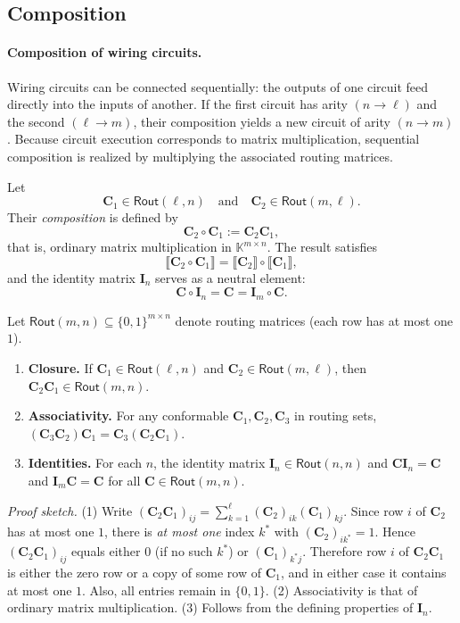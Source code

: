 \documentclass{article}
\newcommand{\K}{\mathbb{K}}                  %
\newcommand{\mat}[1]{\mathbf{#1}}            %
\newcommand{\id}{\mat{I}}                    %
\newcommand{\Rout}[2]{\mathsf{Rout}(#1,#2)}
\begin{document}
\subsection{Composition}

\paragraph{Composition of wiring circuits.}
Wiring circuits can be connected sequentially: the outputs of one circuit feed directly into the inputs of another.  
If the first circuit has arity \((n\!\to\!\ell)\) and the second \((\ell\!\to\! m)\), their composition yields a new circuit of arity \((n\!\to\! m)\).  
Because circuit execution corresponds to matrix multiplication, sequential composition is realized by multiplying the associated routing matrices.

\begin{definition}
Let
\[
\mat{C}_1 \in \Rout{\ell}{n}
\quad\text{and}\quad
\mat{C}_2 \in \Rout{m}{\ell}.
\]
Their \emph{composition} is defined by
\[
\mat{C}_2 \circ \mat{C}_1 := \mat{C}_2 \mat{C}_1,
\]
that is, ordinary matrix multiplication in \(\K^{m\times n}\).
The result satisfies
\[
\llbracket \mat{C}_2 \circ \mat{C}_1 \rrbracket
 = \llbracket \mat{C}_2 \rrbracket \circ \llbracket \mat{C}_1 \rrbracket,
\]
and the identity matrix \(\id_n\) serves as a neutral element:
\[
\mat{C}\circ \id_n = \mat{C} = \id_m\circ \mat{C}.
\]
\end{definition}

\begin{proposition}
Let $\Rout{m}{n}\subseteq\{0,1\}^{m\times n}$ denote routing matrices (each row has at most one $1$).
\begin{enumerate}
  \item \textbf{Closure.} If $\mat{C}_1\in\Rout{\ell}{n}$ and $\mat{C}_2\in\Rout{m}{\ell}$, then
  $\mat{C}_2\mat{C}_1\in\Rout{m}{n}$.
  \item \textbf{Associativity.} For any conformable $\mat{C}_1,\mat{C}_2,\mat{C}_3$ in routing sets,
  $(\mat{C}_3\mat{C}_2)\mat{C}_1=\mat{C}_3(\mat{C}_2\mat{C}_1)$.
  \item \textbf{Identities.} For each $n$, the identity matrix $\id_n\in\Rout{n}{n}$ and
  $\mat{C}\id_n=\mat{C}$ and $\id_m\mat{C}=\mat{C}$ for all $\mat{C}\in\Rout{m}{n}$.
\end{enumerate}
\emph{Proof sketch.}
(1) Write $(\mat{C}_2\mat{C}_1)_{ij}=\sum_{k=1}^{\ell} (\mat{C}_2)_{ik}(\mat{C}_1)_{kj}$.
Since row $i$ of $\mat{C}_2$ has at most one $1$, there is \emph{at most one} index $k^\ast$ with $(\mat{C}_2)_{ik^\ast}=1$.
Hence $(\mat{C}_2\mat{C}_1)_{ij}$ equals either $0$ (if no such $k^\ast$) or $(\mat{C}_1)_{k^\ast j}$.
Therefore row $i$ of $\mat{C}_2\mat{C}_1$ is either the zero row or a copy of some row of $\mat{C}_1$, and in either case it contains at most one $1$.
Also, all entries remain in $\{0,1\}$.
(2) Associativity is that of ordinary matrix multiplication.
(3) Follows from the defining properties of $\id_n$.
\qedhere
\end{proposition}
\end{document}
